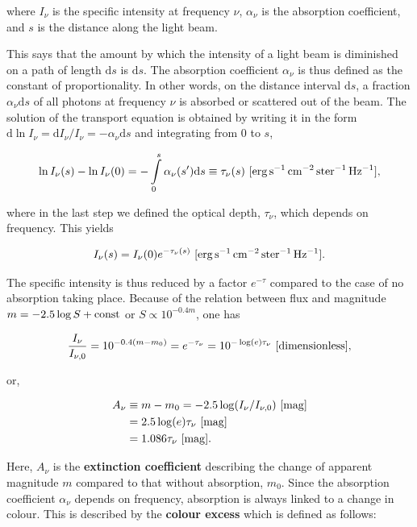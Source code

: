 \documentclass[a4paper,10pt]{article}
\begin{document}
{\noindent}where $I_\nu$ is the specific intensity at frequency $\nu$, $\alpha_\nu$ is the absorption coefficient, and $s$ is the distance along the light beam.

{\noindent}This says that the amount by which the intensity of a light beam is diminished on a path of length $\mathrm{d}s$ is $\mathrm{d}s$. The absorption coefficient $\alpha_\nu$ is thus defined as the constant of proportionality. In other words, on the distance interval $\mathrm{d}s$, a fraction $\alpha_\nu\mathrm{d}s$ of all photons at frequency $\nu$ is absorbed or scattered out of the beam. The solution of the transport equation is obtained by writing it in the form $\mathrm{d}\ln I_\nu=\mathrm{d}I_\nu/I_\nu=-\alpha_\nu\mathrm{d}s$ and integrating from $0$ to $s$,

\begin{align*}
    \ln I_\nu(s)-\ln I_\nu(0) = -\int\limits_0^s \alpha_\nu(s')\mathrm{d}s \equiv \tau_\nu(s) ~ [\rm erg\,s^{-1}\,cm^{-2}\,ster^{-1}\,Hz^{-1}],
\end{align*}

{\noindent}where in the last step we defined the optical depth, $\tau_\nu$, which depends on frequency. This yields

\begin{align*}
    I_\nu(s) = I_\nu(0)e^{-\tau_\nu(s)} ~ [\rm erg\,s^{-1}\,cm^{-2}\,ster^{-1}\,Hz^{-1}].
\end{align*}

{\noindent}The specific intensity is thus reduced by a factor $e^{-\tau}$ compared to the case of no absorption taking place. Because of the relation between flux and magnitude $m=-2.5\log S+{\rm const}$ or $S\propto 10^{-0.4m}$, one has

\begin{align*}
    \frac{I_\nu}{I_{\nu,0}} = 10^{-0.4(m-m_0)} = e^{-\tau_\nu} = 10^{-\log(e)\tau_\nu} ~ [{\rm dimensionless}],
\end{align*}

{\noindent}or,

\begin{align*}
    A_\nu &\equiv m-m_0 = -2.5\log(I_\nu/I_{\nu,0}) ~ [{\rm mag}] \\
          &= 2.5\log(e)\tau_\nu ~ [{\rm mag}] \\
          &= 1.086\tau_\nu ~ [{\rm mag}].
\end{align*}

{\noindent}Here, $A_\nu$ is the \textbf{extinction coefficient} describing the change of apparent magnitude $m$ compared to that without absorption, $m_0$. Since the absorption coefficient $\alpha_\nu$ depends on frequency, absorption is always linked to a change in colour. This is described by the \textbf{colour excess} which is defined as follows:
\end{document}
